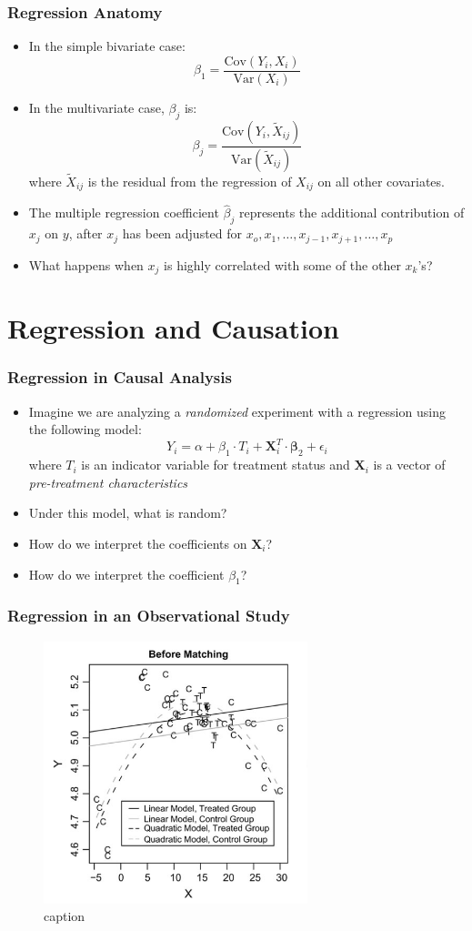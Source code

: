 \documentclass{beamer}
\begin{document}
\begin{frame}[t]\frametitle{Regression Anatomy}
	\begin{itemize}
		\item<+-> In the simple bivariate case:
		 $$\beta_1=\frac{\textrm{Cov}(Y_i,X_i)}{\textrm{Var}(X_i)}$$
		 \item<+-> In the multivariate case, $\beta_j$ is:
		$$\beta_j=\frac{\textrm{Cov}(Y_i,\tilde{X}_{ij})}{\textrm{Var}(\tilde{X}_{ij})}$$
		where $\tilde{X}_{ij}$ is the residual from the regression of $X_{ij}$ on all other covariates.
		\item<+-> The multiple regression coefficient $\hat \beta_j$ represents the additional contribution of $x_j$ on $y$, after $x_j$ has been adjusted for $x_o, x_1, \dots, x_{j-1}, x_{j+1}, \dots, x_p$ 
		\item<+-> What happens when $x_j$ is highly correlated with some of the other $x_k$'s?
	\end{itemize}
\end{frame}

\section{Regression and Causation}
\begin{frame}[t]\frametitle{Regression in  Causal Analysis}
	\begin{itemize}
		\item Imagine we are analyzing a \emph{randomized} experiment with a regression using the following model:
		$$Y_i=\alpha + \beta_1 \cdot T_i + \mathbf{X}^T_i\cdot \mathbf{\beta}_2+\epsilon_i$$
		where $T_i$ is an indicator variable for treatment status and $\mathbf{X}_i$ is a vector of \emph{pre-treatment characteristics}
		\item<+-> Under this model, what is random?  
		\item<+-> How do we interpret the coefficients on $\mathbf{X}_i$?
		\item<+-> How do we interpret the coefficient  $\beta_1$? 
		
	\end{itemize}
\end{frame}

\begin{frame}[t]\frametitle{Regression in an Observational Study}
	\begin{figure}[htbp]
		\centering
			\includegraphics[height=3in]{model_dependence.png}
		\caption{caption}
		\label{fig:model_dependence}
	\end{figure}
	
\end{frame}
\end{document}
